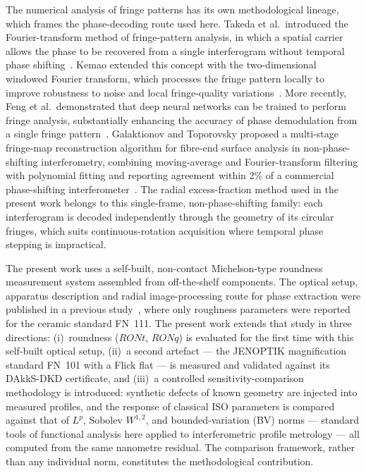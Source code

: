 \documentclass[review]{elsarticle}
\begin{document}
The numerical analysis of fringe patterns has its own methodological lineage, which frames the phase-decoding route used here. Takeda et al.\ introduced the Fourier-transform method of fringe-pattern analysis, in which a spatial carrier allows the phase to be recovered from a single interferogram without temporal phase shifting~\cite{Takeda1982}. Kemao extended this concept with the two-dimensional windowed Fourier transform, which processes the fringe pattern locally to improve robustness to noise and local fringe-quality variations~\cite{Kemao2007}. More recently, Feng et al.\ demonstrated that deep neural networks can be trained to perform fringe analysis, substantially enhancing the accuracy of phase demodulation from a single fringe pattern~\cite{Feng2019dl}. Galaktionov and Toporovsky proposed a multi-stage fringe-map reconstruction algorithm for fibre-end surface analysis in non-phase-shifting interferometry, combining moving-average and Fourier-transform filtering with polynomial fitting and reporting agreement within 2\% of a commercial phase-shifting interferometer~\cite{Galaktionov2026}. The radial excess-fraction method used in the present work belongs to this single-frame, non-phase-shifting family: each interferogram is decoded independently through the geometry of its circular fringes, which suits continuous-rotation acquisition where temporal phase stepping is impractical.

The present work uses a self-built, non-contact Michelson-type roundness measurement system assembled from off-the-shelf components. The optical setup, apparatus description and radial image-processing route for phase extraction were published in a previous study~\cite{kucharski2025radial-0ca}, where only roughness parameters were reported for the ceramic standard FN~111. The present work extends that study in three directions: (i)~roundness ($RONt$, $RONq$) is evaluated for the first time with this self-built optical setup, (ii)~a second artefact — the JENOPTIK magnification standard FN~101 with a Flick flat — is measured and validated against its DAkkS-DKD certificate, and (iii)~a controlled sensitivity-comparison methodology is introduced: synthetic defects of known geometry are injected into measured profiles, and the response of classical ISO parameters is compared against that of $L^p$, Sobolev $W^{1,2}$, and bounded-variation (BV) norms — standard tools of functional analysis here applied to interferometric profile metrology — all computed from the same nanometre residual. The comparison framework, rather than any individual norm, constitutes the methodological contribution.
\end{document}
